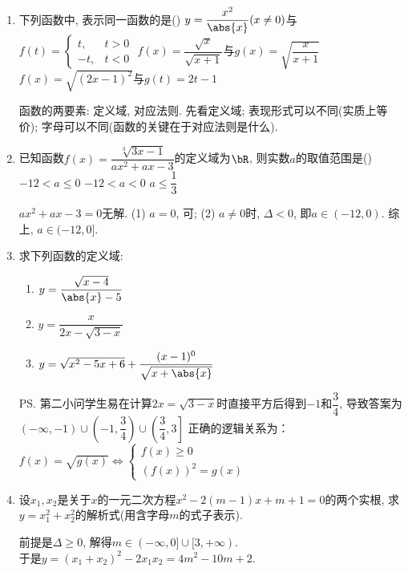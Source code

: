 \begin{enumerate}
\item 下列函数中, 表示同一函数的是\dotfill()
{$y=\dfrac{x^2}{\abs{x}}(x\neq 0)$与$f(t)=\begin{cases}
t, & t>0\\
-t, & t<0
\end{cases}$}
{$f(x)=\dfrac{\sqrt{x}}{\sqrt{x+1}}$与$g(x)=\sqrt{\dfrac{x}{x+1}}$}
{$f(x)=\sqrt{(2x-1)^2}$与$g(t)=2t-1$}
\begin{jieda}
函数的两要素: 定义域, 对应法则. 先看定义域; 表现形式可以不同(实质上等价); 字母可以不同(函数的关键在于对应法则是什么). 
\end{jieda}

\item 已知函数$f(x)=\dfrac{\sqrt[3]{3x-1}}{ax^2+ax-3}$的定义域为$\bR$, 则实数$a$的取值范围是\dotfill()
{$-12<a\leq 0$}
{$-12<a<0$}
{$a\leq\dfrac{1}{3}$}
\begin{jieda}
$ax^2+ax-3=0$无解. (1) $a=0$, 可; (2) $a\neq 0$时, $\Delta<0$, 即$a\in(-12,0)$. 综上, $a\in(-12,0]$. 
\end{jieda}

\item 求下列函数的定义域: 
\begin{enumerate}
\item $y=\dfrac{\sqrt{x-4}}{\abs{x}-5}$ \hfill \blkda[4]{$ [4,5)\cup(5,+\infty)$}
\item $y=\dfrac{x}{2x-\sqrt{3-x}}$ \hfill \blkda[4]{$\left(-\infty,\dfrac{3}{4}\right)\cup\left(\dfrac{3}{4},3\right]$}
\item $y=\sqrt{x^2-5x+6}+\dfrac{(x-1)^0}{\sqrt{x+\abs{x}}}$ \hfill \blkda[4]{$(0,1)\cup(1,2]\cup[3,+\infty)$}
\end{enumerate}
\begin{jieda}
\ps 第二小问学生易在计算$2x=\sqrt{3-x}$时直接平方后得到$-1$和$\dfrac{3}{4}$, 导致答案为$\left(-\infty,-1 \right)\cup\left(-1,\dfrac{3}{4}\right)\cup\left(\dfrac{3}{4},3\right]$ 正确的逻辑关系为：$f(x) = \sqrt{g(x)} \Leftrightarrow \left \{ \begin{array}{l}
     f(x) \geq 0  \\
     (f(x))^2 = g(x)
\end{array} \right.$
\end{jieda}



\item 设$x_1,x_2$是关于$x$的一元二次方程$x^2-2(m-1)x+m+1=0$的两个实根, 求$y=x_1^2+x_2^2$的解析式(用含字母$m$的式子表示). 
\begin{jieda}
前提是$\Delta\geq 0$, 解得$m\in(-\infty,0]\cup[3,+\infty)$. \\
于是$y=(x_1+x_2)^2-2x_1x_2=4m^2-10m+2$. 
\end{jieda}
\begin{vspace_}
\vsp[7]
\end{vspace_}


\end{enumerate}
